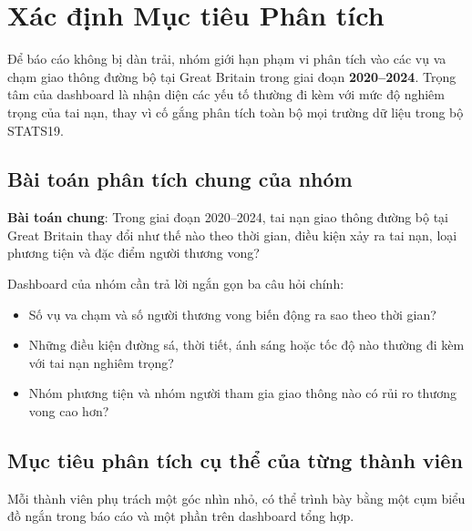 \section{Xác định Mục tiêu Phân tích}
\label{sec:analysis_goals}

Để báo cáo không bị dàn trải, nhóm giới hạn phạm vi phân tích vào các vụ va chạm giao thông đường bộ tại Great Britain trong giai đoạn \textbf{2020--2024}. Trọng tâm của dashboard là nhận diện các yếu tố thường đi kèm với mức độ nghiêm trọng của tai nạn, thay vì cố gắng phân tích toàn bộ mọi trường dữ liệu trong bộ STATS19.

\subsection{Bài toán phân tích chung của nhóm}

\textbf{Bài toán chung}: Trong giai đoạn 2020--2024, tai nạn giao thông đường bộ tại Great Britain thay đổi như thế nào theo thời gian, điều kiện xảy ra tai nạn, loại phương tiện và đặc điểm người thương vong?

Dashboard của nhóm cần trả lời ngắn gọn ba câu hỏi chính:

\begin{itemize}
    \item Số vụ va chạm và số người thương vong biến động ra sao theo thời gian?
    \item Những điều kiện đường sá, thời tiết, ánh sáng hoặc tốc độ nào thường đi kèm với tai nạn nghiêm trọng?
    \item Nhóm phương tiện và nhóm người tham gia giao thông nào có rủi ro thương vong cao hơn?
\end{itemize}

\subsection{Mục tiêu phân tích cụ thể của từng thành viên}

Mỗi thành viên phụ trách một góc nhìn nhỏ, có thể trình bày bằng một cụm biểu đồ ngắn trong báo cáo và một phần trên dashboard tổng hợp.

